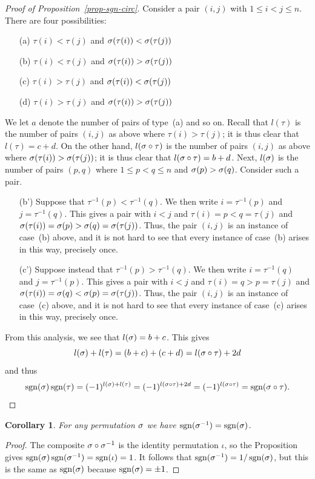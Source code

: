 \documentclass[reqno]{amsart}
\newtheorem{corollary}[theorem]{Corollary}
\theoremstyle{definition}
\begin{document}
\begin{proof}[Proof of Proposition~\ref{prop-sgn-circ}]
 Consider a pair $(i,j)$ with $1\leq i<j\leq n$.  There are four
 possibilities:
 \begin{itemize}
  \item[(a)] $\tau(i)<\tau(j)$ and $\sigma(\tau(i))<\sigma(\tau(j))$
  \item[(b)] $\tau(i)<\tau(j)$ and $\sigma(\tau(i))>\sigma(\tau(j))$
  \item[(c)] $\tau(i)>\tau(j)$ and $\sigma(\tau(i))<\sigma(\tau(j))$
  \item[(d)] $\tau(i)>\tau(j)$ and $\sigma(\tau(i))>\sigma(\tau(j))$
 \end{itemize}
 We let $a$ denote the number of pairs of type~(a) and so on.  Recall
 that $l(\tau)$ is the number of pairs $(i,j)$ as above where
 $\tau(i)>\tau(j)$; it is thus clear that $l(\tau)=c+d$.  On the other
 hand, $l(\sigma\circ\tau)$ is the number of pairs $(i,j)$ as above where
 $\sigma(\tau(i))>\sigma(\tau(j))$; it is thus clear that
 $l(\sigma\circ\tau)=b+d$.  Next, $l(\sigma)$ is the number of pairs $(p,q)$
 where $1\leq p<q\leq n$ and $\sigma(p)>\sigma(q)$.  Consider such a pair.
 \begin{itemize}
  \item[(b')] Suppose that $\tau^{-1}(p)<\tau^{-1}(q)$.  We then write
   $i=\tau^{-1}(p)$ and $j=\tau^{-1}(q)$.  This gives a pair with
   $i<j$ and $\tau(i)=p<q=\tau(j)$ and
   $\sigma(\tau(i))=\sigma(p)>\sigma(q)=\sigma(\tau(j))$.  Thus, the pair $(i,j)$
   is an instance of case~(b) above, and it is not hard to see that
   every instance of case~(b) arises in this way, precisely once.
  \item[(c')] Suppose instead that $\tau^{-1}(p)>\tau^{-1}(q)$.  We
   then write $i=\tau^{-1}(q)$ and $j=\tau^{-1}(p)$.  This gives a
   pair with $i<j$ and $\tau(i)=q>p=\tau(j)$ and
   $\sigma(\tau(i))=\sigma(q)<\sigma(p)=\sigma(\tau(j))$.  Thus, the pair $(i,j)$
   is an instance of case~(c) above, and it is not hard to see that
   every instance of case~(c) arises in this way, precisely once.
 \end{itemize}
 From this analysis, we see that $l(\sigma)=b+c$.  This gives
 \[ l(\sigma)+l(\tau) = (b+c)+(c+d) = l(\sigma\circ\tau) + 2d \]
 and thus
 \[ \operatorname{sgn}(\sigma)\operatorname{sgn}(\tau) = (-1)^{l(\sigma)+l(\tau)} =
     (-1)^{l(\sigma\circ\tau)+2d} = (-1)^{l(\sigma\circ\tau)} =
      \operatorname{sgn}(\sigma\circ\tau).
 \]
\end{proof}
\begin{corollary}\label{cor-sgn-inverse}
 For any permutation $\sigma$ we have $\operatorname{sgn}(\sigma^{-1})=\operatorname{sgn}(\sigma)$.
\end{corollary}
\begin{proof}
 The composite $\sigma\circ\sigma^{-1}$ is the identity permutation $\iota$,
 so the Proposition gives $\operatorname{sgn}(\sigma)\operatorname{sgn}(\sigma^{-1})=\operatorname{sgn}(\iota)=1$.  It
 follows that $\operatorname{sgn}(\sigma^{-1})=1/\operatorname{sgn}(\sigma)$, but this is the same as
 $\operatorname{sgn}(\sigma)$ because $\operatorname{sgn}(\sigma)=\pm 1$.
\end{proof}
\end{document}
